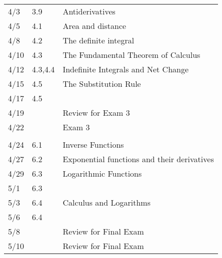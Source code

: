 \begin{center}
\begin{longtable}{lll}
    
    4/3 & 3.9 & Antiderivatives\\
    4/5 & 4.1 & Area and distance\\
    4/8 & 4.2 & The definite integral\\
    4/10 & 4.3 & The Fundamental Theorem of Calculus\\
    4/12 & 4.3,4.4 & Indefinite Integrals and Net Change\\
    4/15 & 4.5 & The Substitution Rule\\
    4/17 & 4.5\\
    4/19 & & Review for Exam 3\\
    4/22 & & Exam 3\\
    \hline\\
    4/24 & 6.1 & Inverse Functions\\
    4/27 & 6.2 & Exponential functions and their derivatives\\
    4/29 & 6.3 & Logarithmic Functions\\
    5/1 & 6.3\\
    5/3 & 6.4 & Calculus and Logarithms\\
    5/6 & 6.4 \\
    5/8 & & Review for Final Exam\\
    5/10 & & Review for Final Exam\\
  \end{longtable}
\end{center}
